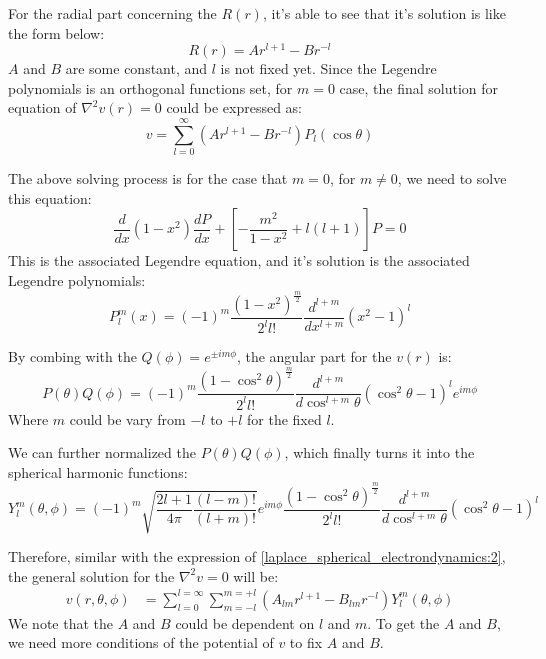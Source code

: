 For the radial part concerning the $R(r)$, it's able to see that it's solution
is like the form below:
\begin{equation}
 R(r) = Ar^{l+1} - Br^{-l}
\end{equation}
$A$ and $B$ are some constant, and $l$ is not fixed yet. Since the Legendre
polynomials is an orthogonal functions set, for $m=0$ case, the final solution for
equation of $\nabla^{2} v(r) = 0$ could be expressed as:
\begin{equation}\label{laplace_spherical_electrondynamics:2}
 v = \sum_{l=0}^{\infty}(Ar^{l+1} - Br^{-l})P_{l}(\cos \theta)
\end{equation}

The above solving process is for the case that $m=0$, for $m \neq 0$, we need to
solve this equation:
\begin{equation}
\frac{d }{d x}(1-x^{2})\frac{d P}{d x} + [-\frac{m^{2}}{1-x^{2}}+l(l+1)]P = 0
\end{equation}
This is the associated Legendre equation, and it's solution is the associated
Legendre polynomials:
\begin{equation}\label{}
 P^{m}_{l}(x) = (-1)^{m}\frac{(1-x^{2})^{\frac{m}{2}}}{2^{l}l!}
\frac{d^{l+m}}{dx^{l+m}}(x^{2}-1)^{l}
\end{equation}

By combing with the $Q(\phi) = e^{\pm im\phi}$, the angular part for the
$v(r)$ is:
\begin{equation}\label{}
P(\theta)Q(\phi) = (-1)^{m}\frac{(1-\cos^{2} \theta)^{\frac{m}{2}}}{2^{l}l!}
\frac{d^{l+m}}{d\cos^{l+m}\theta}(\cos^{2} \theta-1)^{l}e^{im\phi}
\end{equation}
Where $m$ could be vary from $-l$ to $+l$ for the fixed $l$.

We can further normalized the $P(\theta)Q(\phi)$, which finally turns it
into the spherical harmonic functions:
\begin{equation}\label{}
Y^{m}_{l}(\theta,\phi) = (-1)^{m}
\sqrt{\frac{2l+1}{4\pi}\frac{(l-m)!}{(l+m)!}}e^{im\phi} \frac{(1-\cos^{2}\theta)^{\frac{m}{2}}}{2^{l}l!}
\frac{d^{l+m}}{d\cos^{l+m}\theta}(\cos^{2}\theta-1)^{l}
\end{equation}

Therefore, similar with the expression of 
\ref{laplace_spherical_electrondynamics:2}, the general solution 
for the $\nabla^{2} v = 0$ will be:
\begin{align}\label{laplace_spherical_electrondynamics:3}
v(r,\theta,\phi) &= \sum_{l=0}^{l=\infty}\sum_{m=-l}^{m=+l}
(A_{lm}r^{l+1} - B_{lm}r^{-l})Y^{m}_{l}(\theta,\phi)
\end{align}
We note that the $A$ and $B$ could be dependent on $l$ and $m$. To get the 
$A$ and $B$, we need more conditions of the potential of $v$ to fix
$A$ and $B$.

